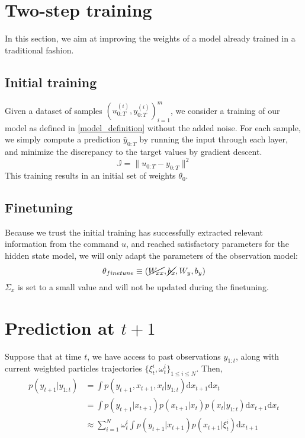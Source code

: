\documentclass[10pt,a4paper]{report}
\begin{document}
\section{Two-step training}
In this section, we aim at improving the weights of a model already trained in a traditional fashion.

\subsection{Initial training}
\label{sec:pretrain}
Given a dataset of samples $(u_{0:T}^{(i)}, y_{0:T}^{(i)})_{i=1}^m$, we consider a training of our model as defined in \ref{model_definition} without the added noise.
For each sample, we simply compute a prediction $\hat y_{0:T}$ by running the input through each layer, and minimize the discrepancy to the target values by gradient descent.
$$
        \mathbb{J} = \| u_{0:T} - y_{0:T} \|^2
$$
This training results in an initial set of weights $\theta_0$.

\subsection{Finetuning}
Because we trust the initial training has successfully extracted relevant information from the command $u$, and reached satisfactory parameters for the hidden state model, we will only adapt the parameters of the observation model:
$$
        \theta_{finetune} \equiv (\cancel{W_{xx}}, \cancel{b_x}, W_y, b_y)
$$
$\Sigma_x$ is set to a small value and will not be updated during the finetuning.

\section{Prediction at $t+1$}
Suppose that at time $t$, we have access to past observations $y_{1:t}$, along with current weighted particles trajectories $\{\xi_t^i, \omega_t^i\}_{1 \leq i \leq N}$.
Then,
\begin{align*}
        p(y_{t+1}|y_{1:t}) & = \int p(y_{t+1}, x_{t+1}, x_t|y_{1:t})\mathrm{d}x_{t+1}\mathrm{d}x_t                    \\
                           & = \int p(y_{t+1}|x_{t+1}) p(x_{t+1}|x_t) p(x_t|y_{1:t})\mathrm{d}x_{t+1}\mathrm{d}x_t    \\
                           & \approx \sum_{i=1}^N \omega_t^i \int p(y_{t+1}|x_{t+1}) p(x_{t+1}|\xi_t^i) \mathrm{d}x_{t+1} \\
\end{align*}
\end{document}
